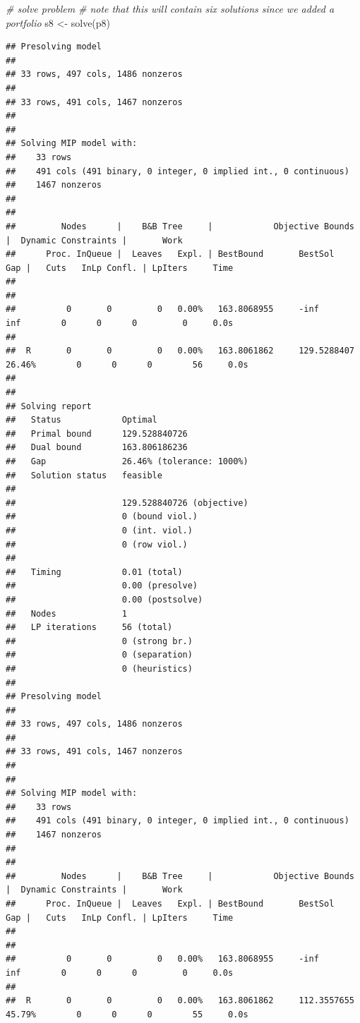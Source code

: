 \documentclass[
  12pt,
]{book}
\newenvironment{Shaded}{\begin{snugshade}}{\end{snugshade}}
\newcommand{\CommentTok}[1]{\textcolor[rgb]{0.56,0.35,0.01}{\textit{#1}}}
\newcommand{\FunctionTok}[1]{\textcolor[rgb]{0.00,0.00,0.00}{#1}}
\newcommand{\NormalTok}[1]{#1}
\newcommand{\OtherTok}[1]{\textcolor[rgb]{0.56,0.35,0.01}{#1}}
\begin{document}
\begin{Shaded}
\begin{Highlighting}[]
\CommentTok{\# solve problem}
\CommentTok{\# note that this will contain six solutions since we added a portfolio}
\NormalTok{s8 }\OtherTok{\textless{}{-}} \FunctionTok{solve}\NormalTok{(p8)}
\end{Highlighting}
\end{Shaded}

\begin{verbatim}
## Presolving model
## 
## 33 rows, 497 cols, 1486 nonzeros
## 
## 33 rows, 491 cols, 1467 nonzeros
## 
## 
## Solving MIP model with:
##    33 rows
##    491 cols (491 binary, 0 integer, 0 implied int., 0 continuous)
##    1467 nonzeros
## 
## 
##         Nodes      |    B&B Tree     |            Objective Bounds              |  Dynamic Constraints |       Work      
##      Proc. InQueue |  Leaves   Expl. | BestBound       BestSol              Gap |   Cuts   InLp Confl. | LpIters     Time
## 
## 
##          0       0         0   0.00%   163.8068955     -inf                 inf        0      0      0         0     0.0s
## 
##  R       0       0         0   0.00%   163.8061862     129.5288407       26.46%        0      0      0        56     0.0s
## 
## 
## Solving report
##   Status            Optimal
##   Primal bound      129.528840726
##   Dual bound        163.806186236
##   Gap               26.46% (tolerance: 1000%)
##   Solution status   feasible
## 
##                     129.528840726 (objective)
##                     0 (bound viol.)
##                     0 (int. viol.)
##                     0 (row viol.)
## 
##   Timing            0.01 (total)
##                     0.00 (presolve)
##                     0.00 (postsolve)
##   Nodes             1
##   LP iterations     56 (total)
##                     0 (strong br.)
##                     0 (separation)
##                     0 (heuristics)
## 
## Presolving model
## 
## 33 rows, 497 cols, 1486 nonzeros
## 
## 33 rows, 491 cols, 1467 nonzeros
## 
## 
## Solving MIP model with:
##    33 rows
##    491 cols (491 binary, 0 integer, 0 implied int., 0 continuous)
##    1467 nonzeros
## 
## 
##         Nodes      |    B&B Tree     |            Objective Bounds              |  Dynamic Constraints |       Work      
##      Proc. InQueue |  Leaves   Expl. | BestBound       BestSol              Gap |   Cuts   InLp Confl. | LpIters     Time
## 
## 
##          0       0         0   0.00%   163.8068955     -inf                 inf        0      0      0         0     0.0s
## 
##  R       0       0         0   0.00%   163.8061862     112.3557655       45.79%        0      0      0        55     0.0s

\end{verbatim}
\end{document}
